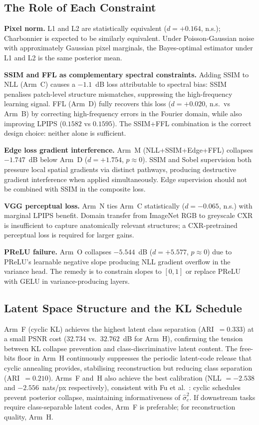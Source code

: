 \documentclass[12pt, a4paper, twoside, openright]{book}
\begin{document}
\subsection{The Role of Each Constraint}
\label{sec:disc:findings:constraints}

\textbf{Pixel norm.} L1 and L2 are statistically equivalent ($d=+0.164$, n.s.); Charbonnier is expected to be similarly equivalent. Under Poisson-Gaussian noise with approximately Gaussian pixel marginals, the Bayes-optimal estimator under L1 and L2 is the same posterior mean.

\textbf{SSIM and FFL as complementary spectral constraints.} Adding SSIM to NLL (Arm~C) causes a $-1.1$~dB loss attributable to spectral bias: SSIM penalises patch-level structure mismatches, suppressing the high-frequency learning signal. FFL (Arm~D) fully recovers this loss ($d=+0.020$, n.s.\ vs Arm~B) by correcting high-frequency errors in the Fourier domain, while also improving LPIPS ($0.1582$ vs $0.1595$). The SSIM+FFL combination is the correct design choice: neither alone is sufficient.

\textbf{Edge loss gradient interference.} Arm~M (NLL+SSIM+Edge+FFL) collapses $-1.747$~dB below Arm~D ($d=+1.754$, $p\approx 0$). SSIM and Sobel supervision both pressure local spatial gradients via distinct pathways, producing destructive gradient interference when applied simultaneously. Edge supervision should not be combined with SSIM in the composite loss.

\textbf{VGG perceptual loss.} Arm~N ties Arm~C statistically ($d=-0.065$, n.s.) with marginal LPIPS benefit. Domain transfer from ImageNet RGB to greyscale CXR is insufficient to capture anatomically relevant structures; a CXR-pretrained perceptual loss is required for larger gains.

\textbf{PReLU failure.} Arm~O collapses $-5.544$~dB ($d=+5.577$, $p\approx 0$) due to PReLU's learnable negative slope producing NLL gradient overflow in the variance head. The remedy is to constrain slopes to $[0,1]$ or replace PReLU with GELU in variance-producing layers.

\subsection{Latent Space Structure and the KL Schedule}
\label{sec:disc:findings:latent}

Arm~F (cyclic KL) achieves the highest latent class separation (ARI~$=0.333$) at a small PSNR cost ($32.734$ vs.\ $32.762$~dB for Arm~H), confirming the tension between KL collapse prevention and class-discriminative latent content. The free-bits floor in Arm~H continuously suppresses the periodic latent-code release that cyclic annealing provides, stabilising reconstruction but reducing class separation (ARI~$=0.210$). Arms~F and~H also achieve the best calibration (NLL $= -2.538$ and $-2.556$~nats/px respectively), consistent with Fu et al.\ \cite{fu_cyclical_2019}: cyclic schedules prevent posterior collapse, maintaining informativeness of $\hat{\sigma}^2_e$. If downstream tasks require class-separable latent codes, Arm~F is preferable; for reconstruction quality, Arm~H.
\end{document}
